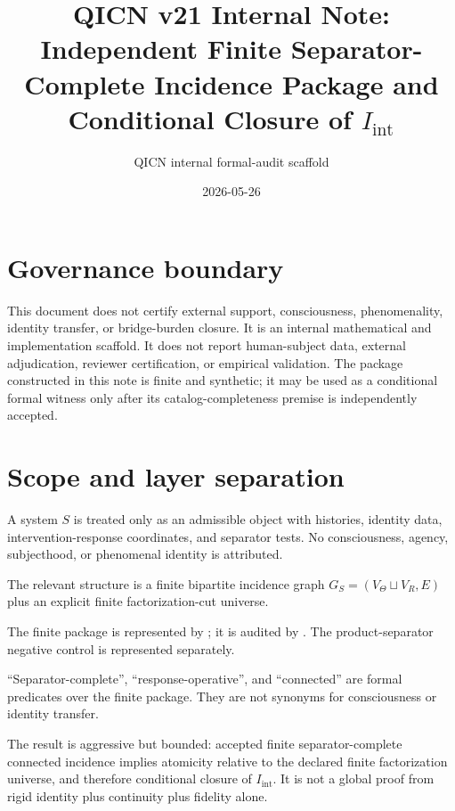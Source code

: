 \documentclass[11pt]{article}
\title{QICN v21 Internal Note: Independent Finite Separator-Complete Incidence Package and Conditional Closure of \texorpdfstring{$I_{\mathrm{int}}$}{I_int}}
\author{QICN internal formal-audit scaffold}
\date{2026-05-26}
\newcommand{\Iint}{I_{\mathrm{int}}}
\newcommand{\VTheta}{V_{\Theta}}
\newcommand{\VR}{V_R}
\begin{document}
\maketitle

\section*{Governance boundary}
This document does not certify external support, consciousness, phenomenality, identity transfer, or bridge-burden closure. It is an internal mathematical and implementation scaffold. It does not report human-subject data, external adjudication, reviewer certification, or empirical validation. The package constructed in this note is finite and synthetic; it may be used as a conditional formal witness only after its catalog-completeness premise is independently accepted.

\section{Scope and layer separation}

\begin{description}[leftmargin=2.9cm]
  \item[Ontology.] A system $S$ is treated only as an admissible object with histories, identity data, intervention-response coordinates, and separator tests. No consciousness, agency, subjecthood, or phenomenal identity is attributed.
  \item[Mathematical model.] The relevant structure is a finite bipartite incidence graph $G_S=(\VTheta\sqcup\VR,E)$ plus an explicit finite factorization-cut universe.
  \item[Implementation.] The finite package is represented by ; it is audited by . The product-separator negative control is represented separately.
  \item[Language.] ``Separator-complete'', ``response-operative'', and ``connected'' are formal predicates over the finite package. They are not synonyms for consciousness or identity transfer.
  \item[Interpretation.] The result is aggressive but bounded: accepted finite separator-complete connected incidence implies atomicity relative to the declared finite factorization universe, and therefore conditional closure of $\Iint$. It is not a global proof from rigid identity plus continuity plus fidelity alone.
\end{description}
\end{document}
